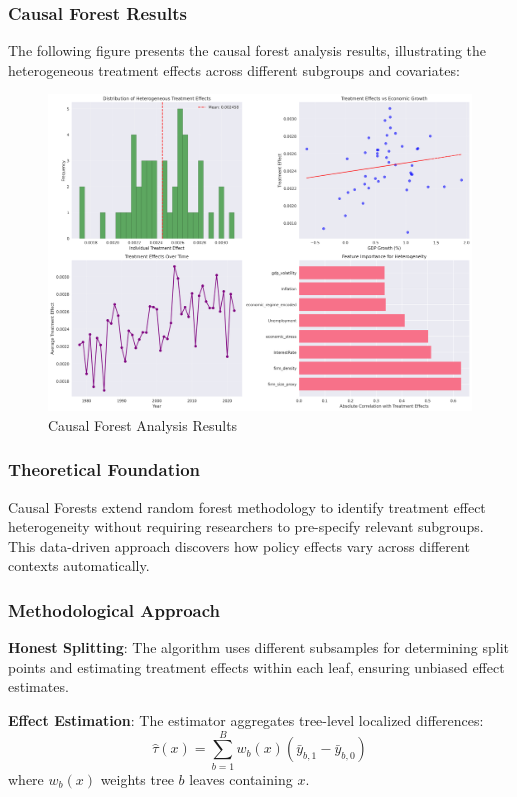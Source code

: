 \subsubsection{Causal Forest Results}
The following figure presents the causal forest analysis results, illustrating the heterogeneous treatment effects across different subgroups and covariates:

\begin{figure}[H]
    \centering
    \includegraphics[width=\textwidth]{figures/causal_forest_results.png}
    \caption{Causal Forest Analysis Results}
    \label{fig:causal_forest_results}
\end{figure}


\subsubsection{Theoretical Foundation}
Causal Forests extend random forest methodology to identify treatment effect heterogeneity without requiring researchers to pre-specify relevant subgroups. This data-driven approach discovers how policy effects vary across different contexts automatically.

\subsubsection{Methodological Approach}
\textbf{Honest Splitting}: The algorithm uses different subsamples for determining split points and estimating treatment effects within each leaf, ensuring unbiased effect estimates.

\textbf{Effect Estimation}: The estimator aggregates tree-level localized differences:
\begin{equation}
  \hat{\tau}(x) = \sum_{b=1}^B w_b(x) \left( \bar{y}_{b,1} - \bar{y}_{b,0} \right)
\end{equation}
where $w_b(x)$ weights tree $b$ leaves containing $x$.

